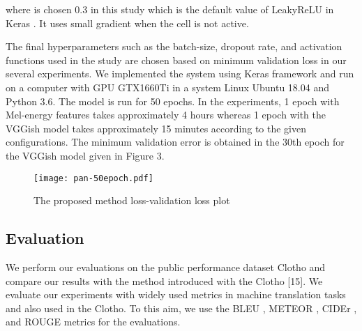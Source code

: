 \documentclass{article}
\begin{document}
 where  is chosen 0.3 in this study which is the default value of LeakyReLU in Keras \cite{keras}. It uses small gradient when the cell is not active.
 
The final hyperparameters such as the batch-size, dropout rate, and activation functions used in the study are chosen based on minimum validation loss in our several experiments. We implemented the system using Keras framework and run on a computer with GPU GTX1660Ti in a system Linux Ubuntu 18.04 and Python 3.6. The model is run for 50 epochs. In the experiments, 1 epoch with Mel-energy features takes approximately 4 hours whereas 1 epoch with the VGGish model takes approximately 15 minutes according to the given configurations. The minimum validation error is obtained in the 30th epoch for the VGGish model given in Figure 3.


 \begin{figure}[t]
 	\centering
 	\texttt{[image: pan-50epoch.pdf]}
 	\caption{The proposed method loss-validation loss plot}
 	\label{figTraining}
 \end{figure}
\subsection{Evaluation}

We perform our evaluations on the public performance dataset Clotho and compare our results with the method introduced with the Clotho [15]. We evaluate our experiments with widely used metrics in machine translation tasks and also used in the Clotho. To this aim, we use the BLEU \cite{Papineni02bleu:a}, METEOR \cite{banerjee-lavie-2005-meteor}, CIDEr \cite{DBLP:journals/corr/VedantamZP14a}, and ROUGE \cite{lin-2004-rouge} metrics for the evaluations.
\end{document}
